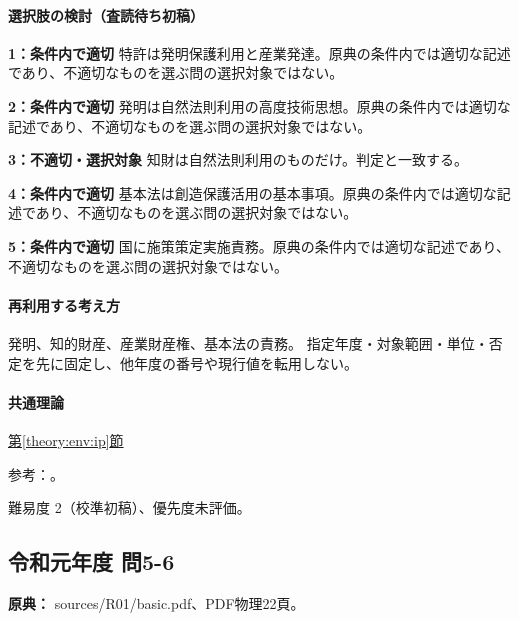 \paragraph{選択肢の検討（査読待ち初稿）}\mbox{}\par

\noindent\textbf{1：条件内で適切} 特許は発明保護利用と産業発達。原典の条件内では適切な記述であり、不適切なものを選ぶ問の選択対象ではない。\par

\noindent\textbf{2：条件内で適切} 発明は自然法則利用の高度技術思想。原典の条件内では適切な記述であり、不適切なものを選ぶ問の選択対象ではない。\par

\noindent\textbf{3：不適切・選択対象} 知財は自然法則利用のものだけ。判定と一致する。\par

\noindent\textbf{4：条件内で適切} 基本法は創造保護活用の基本事項。原典の条件内では適切な記述であり、不適切なものを選ぶ問の選択対象ではない。\par

\noindent\textbf{5：条件内で適切} 国に施策策定実施責務。原典の条件内では適切な記述であり、不適切なものを選ぶ問の選択対象ではない。\par

\paragraph{再利用する考え方} 発明、知的財産、産業財産権、基本法の責務。 指定年度・対象範囲・単位・否定を先に固定し、他年度の番号や現行値を転用しない。

\paragraph{共通理論} \hyperref[theory:env:ip]{第\ref*{theory:env:ip}節}

\par 参考：\cite{ip_patent_statute,ip_broad_scope}。

\par 難易度 2（校準初稿）、優先度未評価。

\subsection{令和元年度 問5-6}
\label{q:r01-reg-basic-5-6}

\noindent\textbf{原典：} sources/R01/basic.pdf、PDF物理22頁。

